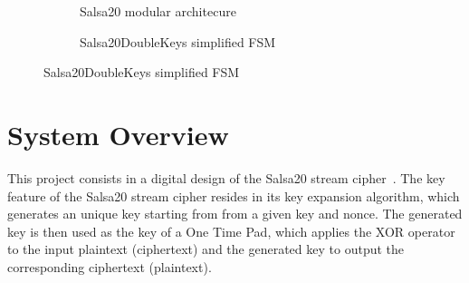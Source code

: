 \documentclass[letterpaper, 10pt, oneside]{article}
\begin{document}


\begin{figure}[!t]
    \begin{subfigure}[c]{0.5\textwidth}
        \centering
        \caption{Salsa20 modular architecure}
        \label{fig:architecture}
    \end{subfigure}
    \begin{subfigure}[c]{0.5\textwidth}
        \centering
        \caption{Salsa20DoubleKeys simplified FSM}
        \label{fig:fsm}
    \end{subfigure}
\end{figure}

\section{System Overview}
This project consists in a digital design of the Salsa20 stream cipher~\cite{salsa20}.
The key feature of the Salsa20 stream cipher resides in its key expansion algorithm, which generates an unique key starting from from a given key and nonce.
The generated key is then used as the key of a One Time Pad, which applies the XOR operator to the input plaintext (ciphertext) and the generated key to output the corresponding ciphertext (plaintext).
\end{document}
